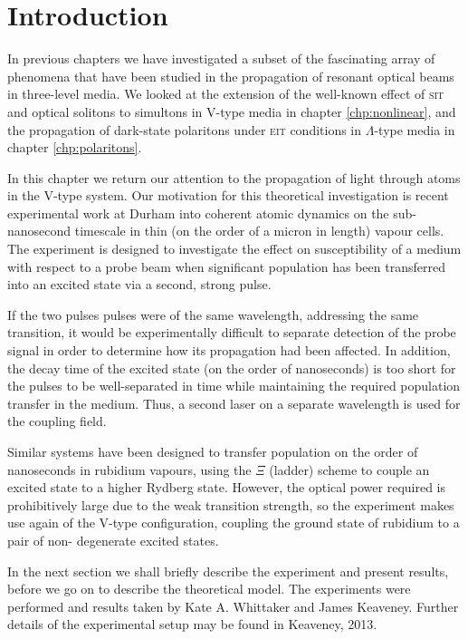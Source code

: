 \section{Introduction}
  \label{sec:simultons_intro}

    In previous chapters we have investigated a subset of the fascinating array
    of phenomena that have been studied in the propagation of resonant optical
    beams in three-level media. We looked at the extension of the well-known
    effect of \textsc{sit} and optical solitons to simultons in V-type media in
    chapter \ref{chp:nonlinear}, and the propagation of dark-state polaritons
    under \textsc{eit} conditions in $\Lambda$-type media in chapter
    \ref{chp:polaritons}.


    In this chapter we return our attention to the propagation of light through
    atoms in the V-type system. Our motivation for this theoretical
    investigation is recent experimental work at Durham into coherent atomic
    dynamics on the sub-nanosecond timescale in thin (on the order of a micron
    in length) vapour cells.\cite{Keaveney2013} The experiment is designed to
    investigate the effect on susceptibility of a medium with respect to a probe
    beam when significant population has been transferred into an excited state
    via a second, strong pulse.

    If the two pulses pulses were of the same wavelength, addressing the same
    transition, it would be experimentally difficult to separate detection of
    the probe signal in order to determine how its propagation had been
    affected. In addition, the decay time of the excited state (on the order of
    nanoseconds) is too short for the pulses to be well-separated in time while
    maintaining the required population transfer in the medium. Thus, a second
    laser on a separate wavelength is used for the coupling field.

    Similar systems have been designed to transfer population on the order of
    nanoseconds in rubidium vapours, using the $\Xi$ (ladder) scheme to couple an
    excited state to a higher Rydberg state.\cite{Huber2011,Baluktsian2013}
    However, the optical power required is prohibitively large due to the weak
    transition strength, so the experiment makes use again of the V-type
    configuration, coupling the ground state of rubidium to a pair of non-
    degenerate excited states.

    In the next section we shall briefly describe the experiment and present
    results, before we go on to describe the theoretical model. The experiments
    were performed and results taken by Kate A. Whittaker and James Keaveney.
    Further details of the experimental setup may be found in Keaveney,
    2013.\cite{Keaveney2013}
